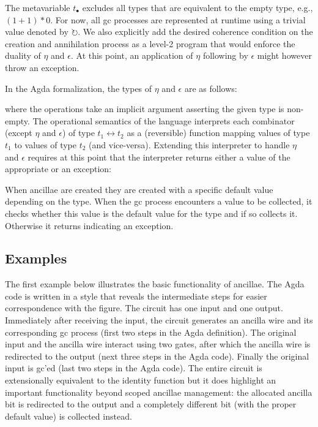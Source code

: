 \documentclass[sigplan,10pt,review,anonymous]{acmart}
\newcommand{\net}{t_\bullet}
\newcommand{\gcv}{\circlearrowright}
\begin{document}
The metavariable $\net$ excludes all types that are equivalent to the
empty type, e.g., $(1 + 1) * 0$. For now, all gc processes are
represented at runtime using a trivial value denoted by $\gcv$. We
also explicitly add the desired coherence condition on the creation
and annihilation process as a level-2 program that would enforce the
duality of $\eta$ and $\epsilon$. At this point, an application of
$\eta$ following by $\epsilon$ might however throw an exception.

In the Agda formalization, the types of $\eta$ and $\epsilon$ are as follows:

\EtaEpsilon{}

\noindent where the operations take an implicit argument asserting the
given type is non-empty. The operational semantics of the language
interprets each combinator (except $\eta$ and $\epsilon$) of type
$t_1 \leftrightarrow t_2$ as a (reversible) function mapping values of
type $t_1$ to values of type $t_2$ (and vice-versa). Extending this
interpreter to handle $\eta$ and $\epsilon$ requires at this point
that the interpreter returns either a value of the appropriate or an
exception:

\dyninterp{}

When ancillae are created they are created with a specific default
value depending on the type. When the gc process encounters a value to
be collected, it checks whether this value is the default value for
the type and if so collects it. Otherwise it returns
 indicating an exception.

\subsection{Examples}

The first example below illustrates the basic functionality of
ancillae. The Agda code is written in a style that reveals the
intermediate steps for easier correspondence with the figure. The
circuit has one input and one output. Immediately after receiving the
input, the circuit generates an ancilla wire and its corresponding gc
process (first two steps in the Agda definition). The original input
and the ancilla wire interact using two  gates,
after which the ancilla wire is redirected to the output (next three
steps in the Agda code). Finally the original input is gc'ed (last two
steps in the Agda code). The entire circuit is extensionally
equivalent to the identity function but it does highlight an important
functionality beyond scoped ancillae management: the allocated ancilla
bit is redirected to the output and a completely different bit (with
the proper default value) is collected instead.
\end{document}
